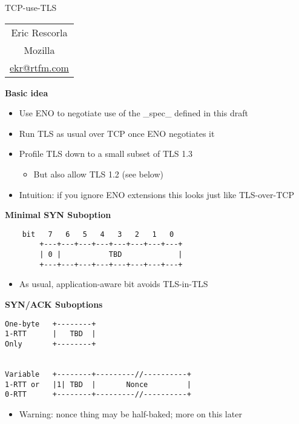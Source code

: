 \documentclass[helvetica]{seminar}
\newcommand{\heading}[1]{%
  \begin{center} 
    \large\bf 
    #1 
  \end{center} 
  \vspace{.4 in}}
\begin{document}
\begin{slide}
\begin{center}
\vspace{.5 in}
\LARGE{{\bf}TCP-use-TLS}\\
\vspace{.2in}
\large{
\begin{tabular}{c}
Eric Rescorla\\
Mozilla\\
\url{ekr@rtfm.com}
\end{tabular}
}
\end{center}

\end{slide}
\centerslidesfalse 

\begin{slide}
\heading{Basic idea}

\begin{itemize}
\item Use ENO to negotiate use of the \_spec\_ defined in this draft
\item Run TLS as usual over TCP once ENO negotiates it
\item Profile TLS down to a small subset of TLS 1.3
  \begin{itemize}
  \item But also allow TLS 1.2 (see below)
  \end{itemize}
\item Intuition: if you ignore ENO extensions this looks just like TLS-over-TCP
\end{itemize}

\end{slide}


\begin{slide}
\heading{Minimal SYN Suboption}

\begin{verbatim}
    bit   7   6   5   4   3   2   1   0
        +---+---+---+---+---+---+---+---+
        | 0 |           TBD             |
        +---+---+---+---+---+---+---+---+
\end{verbatim}

\begin{itemize}
\item As usual, application-aware bit avoids TLS-in-TLS
\end{itemize}
\end{slide}

\begin{slide}
\heading{SYN/ACK Suboptions}

\begin{verbatim}
One-byte   +--------+
1-RTT      |   TBD  |
Only       +--------+  


Variable   +--------+---------//----------+
1-RTT or   |1| TBD  |       Nonce         |
0-RTT      +--------+---------//----------+
\end{verbatim}

\begin{itemize}
\item Warning: nonce thing may be half-baked; more on this later
\end{itemize}
\end{slide}
\end{document}
